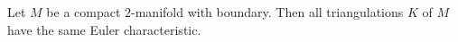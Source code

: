 Let $M$ be a compact $2$-manifold with boundary. Then all triangulations $K$ of $M$ have the same Euler characteristic.
